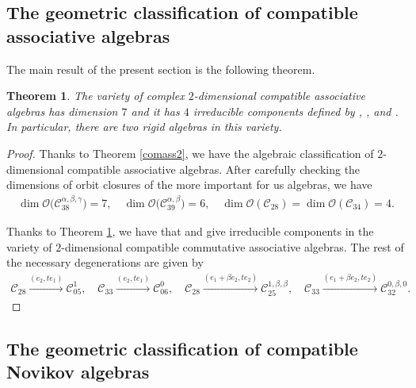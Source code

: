 \documentclass[pdftex]{sigma}
\numberwithin{equation}{section}
\newtheorem{Theorem}{Theorem}[section]
\begin{document}
\subsection{The geometric classification of compatible associative algebras}
The main result of the present section is the following theorem.

\begin{Theorem}\label{geo3}
The variety of complex $2$-dimensional compatible associative algebras has
dimension $7$ and it has $4$ irreducible components defined by
,
,
 and
.
In particular, there are two rigid algebras in this variety.

\end{Theorem}

\begin{proof}
 Thanks to Theorem \ref{comass2}, we have the algebraic classification of
 $2$-dimensional compatible associative algebras.
After carefully checking the dimensions of orbit closures of the more important for us algebras, we have
\begin{gather*}
\dim \mathcal{O}\bigl(\mathcal{C}_{38}^{\alpha,\beta,\gamma}\bigr)=7, \quad
\dim \mathcal{O}\bigl(\mathcal{C}_{39}^{\alpha,\beta}\bigr)=6, \quad
\dim \mathcal{O}(\mathcal{C}_{28})=\dim \mathcal{O}(\mathcal{C}_{34})=4.
\end{gather*}

Thanks to Theorem \ref{geo3}, we have that
 and  give irreducible components in the variety of $2$-dimensional compatible commutative associative algebras.
The rest of the necessary degenerations are given by
\begin{gather*}
 \mathcal{C}_{28} \xrightarrow{ ( e_2, te_1)} \mathcal{C}_{05}^1, \quad
 \mathcal{C}_{33} \xrightarrow{ ( e_2, te_1)} \mathcal{C}_{06}^0, \quad
 \mathcal{C}_{28} \xrightarrow{ (e_1+\beta e_2, te_2)} \mathcal{C}_{25}^{1,\beta,\beta}, \quad
 \mathcal{C}_{33} \xrightarrow{ ( e_1+\beta e_2, te_2)} \mathcal{C}_{32}^{0,\beta,0}.\tag*{\qed} \end{gather*}\renewcommand{\qed}{}
\end{proof}

\subsection{The geometric classification of compatible Novikov algebras}
\end{document}
